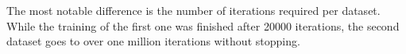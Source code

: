 \begin{answer}
    The most notable difference is the number of iterations required per dataset.
    While the training of the first one was finished after 20000 iterations, the second dataset goes to over one million iterations without stopping.
\end{answer}
